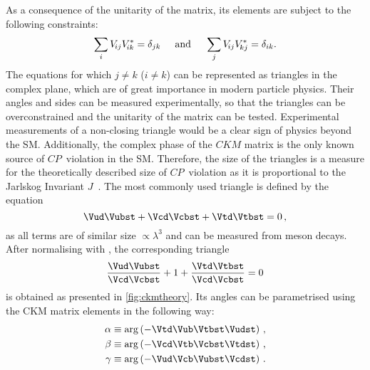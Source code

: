 As a consequence of the unitarity of the matrix, its elements are subject to the following constraints:
\begin{equation}
\sum_{i} V_{{\kern -0.1em}ij}V_{{\kern -0.1em}ik}^{*} = \delta_{jk}\hspace{0.5cm}\text{and}\hspace{0.5cm}
\sum_{j} V_{{\kern -0.1em}ij}V_{{\kern -0.1em}kj}^{*} = \delta_{ik}\label{eq:CKMtriangleEquations}.
\end{equation}
The equations for which $j\!\neq\!k$ ($i\!\neq\!k$) can be represented as triangles in the complex plane, which are of great importance in modern particle physics.
Their angles and sides can be measured experimentally, so that the triangles can be overconstrained and the unitarity of the matrix can be tested.
Experimental measurements of a non-closing triangle would be a clear sign of physics beyond the \ac{SM}.
Additionally, the complex phase of the $CKM$ matrix is the only known source of \mbox{$CP$ violation} in the \ac{SM}.
Therefore, the size of the triangles is a measure for the theoretically described size of \mbox{$CP$ violation} as it is proportional to the Jarlskog Invariant $J$~\cite{PhysRevLett.55.1039}.
The most commonly used triangle is defined by the equation
\begin{equation}
\Vud\Vubst + \Vcd\Vcbst + \Vtd\Vtbst = 0\,,
\end{equation}
as all terms are of similar size $\propto\lambda^3$ and can be measured from \B meson decays.
After normalising with \Vcd\Vcbst, the corresponding triangle
\begin{equation}
\frac{\Vud\Vubst}{\Vcd\Vcbst} + 1 + \frac{\Vtd\Vtbst}{\Vcd\Vcbst} = 0 \label{eq:CKMtriangle}
\end{equation}
is obtained as presented in \cref{fig:ckmtheory}.
Its angles can be parametrised using the CKM matrix elements in the following way:
\begin{equation}
\begin{aligned}
\alpha&\equiv\arg\left(-\Vtd\Vub\Vtbst\Vudst\right)\,,\\
\beta&\equiv\arg\left(-\Vcd\Vtb\Vcbst\Vtdst\right)\,,\\
\gamma&\equiv\arg\left(-\Vud\Vcb\Vubst\Vcdst\right)\,.\label{eq:CKMangles}
\end{aligned}
\end{equation}

